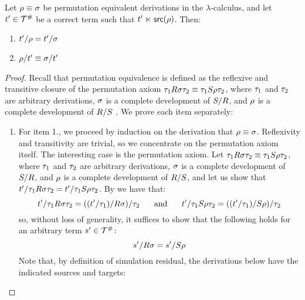 \begin{proposition}[Compatibility] %
Let $\rho \equiv \sigma$ be permutation equivalent derivations in the $\lambda$-calculus,
and let $t' \in \mathcal{T}^{\mathtt{\#}}$ be a correct term such that $t' \mathrel{\ltimes} \mathsf{src}(\rho)$.
Then:
\begin{enumerate}
\item $t'/\rho = t'/\sigma$
\item $\rho/t' \equiv \sigma/t'$
\end{enumerate}
\end{proposition}
\begin{proof}
Recall that permutation equivalence is defined as the reflexive and transitive closure of the
permutation axiom $\tau_1 R \sigma \tau_2 \equiv \tau_1 S \rho \tau_2$,
where
$\tau_1$ and $\tau_2$ are arbitrary derivations,
$\sigma$ is a complete development of $S/R$,
  and $\rho$ is a complete development of $R/S$ \cite{thesismellies}.
We prove each item separately:
\begin{enumerate}
\item
  For item 1., we proceed by induction on the derivation that $\rho \equiv \sigma$.
  Reflexivity and transitivity are trivial, so we concentrate on the permutation axiom itself.
  The interesting case is the permutation axiom.
  Let $\tau_1 R \sigma \tau_2 \equiv \tau_1 S \rho \tau_2$,
  where
  $\tau_1$ and $\tau_2$ are arbitrary derivations,
  $\sigma$ is a complete development of $S/R$,
  and $\rho$ is a complete development of $R/S$,
  and let us show that $t'/\tau_1 R \sigma \tau_2 = t'/\tau_1 S \rho \tau_2$.
  By  we have that:
  \[
    t'/\tau_1 R \sigma \tau_2 = ((t'/\tau_1)/R \sigma)/\tau_2
    \hspace{.5cm}
    \text{ and }
    \hspace{.5cm}
    t'/\tau_1 S \rho \tau_2 = ((t'/\tau_1)/S \rho)/ \tau_2
  \]
  so, without loss of generality,
  it suffices to show that the following holds for an arbitrary term $s' \in \mathcal{T}^{\mathtt{\#}}$:
  \[
    s'/R\sigma = s'/S\rho
  \]
  Note that, by definition of simulation residual, the derivations below have the indicated sources and targets:

\end{enumerate}
\end{proof}
